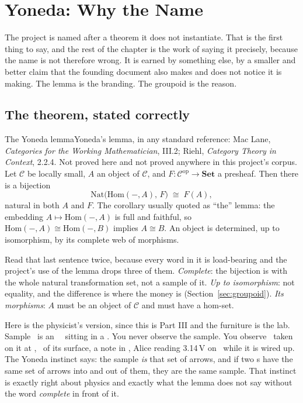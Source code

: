 \chapter{Yoneda: Why the Name}

The project is named after a theorem it does not instantiate. That is the first thing to say, and the rest of the chapter is the work of saying it precisely, because the name is not therefore wrong. It is earned by something else, by a smaller and better claim that the founding document also makes and does not notice it is making. The lemma is the branding. The groupoid is the reason.

\section{The theorem, stated correctly}

\begin{Theorem}{The Yoneda lemma}{Yoneda's lemma, in any standard reference: Mac Lane, \textit{Categories for the Working Mathematician}, III.2; Riehl, \textit{Category Theory in Context}, 2.2.4. Not proved here and not proved anywhere in this project's corpus.}
Let $\mathcal{C}$ be locally small, $A$ an object of $\mathcal{C}$, and $F: \mathcal{C}^{\mathrm{op}} \to \mathbf{Set}$ a presheaf. Then there is a bijection
\[ \mathrm{Nat}\big(\mathrm{Hom}(-,A),\, F\big) \;\cong\; F(A), \]
natural in both $A$ and $F$. The corollary usually quoted as ``the'' lemma: the embedding $A \mapsto \mathrm{Hom}(-,A)$ is full and faithful, so $\mathrm{Hom}(-,A) \cong \mathrm{Hom}(-,B)$ implies $A \cong B$. An object is determined, up to isomorphism, by its complete web of morphisms.
\end{Theorem}

Read that last sentence twice, because every word in it is load-bearing and the project's use of the lemma drops three of them. \emph{Complete}: the bijection is with the whole natural transformation set, not a sample of it. \emph{Up to isomorphism}: not equality, and the difference is where the money is (Section~\ref{sec:groupoid}). \emph{Its morphisms}: $A$ must be an object of $\mathcal{C}$ and must have a hom-set.

Here is the physicist's version, since this is Part III and the furniture is the lab. Sample \labSampleAlt\ is an \labMaterialShort\ \labSampleClass\ sitting in a \labCarrier. You never observe the sample. You observe \labFigure\ taken on it at \labColdTemp, \labImaging\ of its surface, a note in \labLog, Alice reading 3.14\,V on \labReadout\ while it is wired up. The Yoneda instinct says: the sample \emph{is} that set of arrows, and if two \labCarrier s have the same set of arrows into and out of them, they are the same sample. That instinct is exactly right about physics and exactly what the lemma does not say without the word \emph{complete} in front of it.

